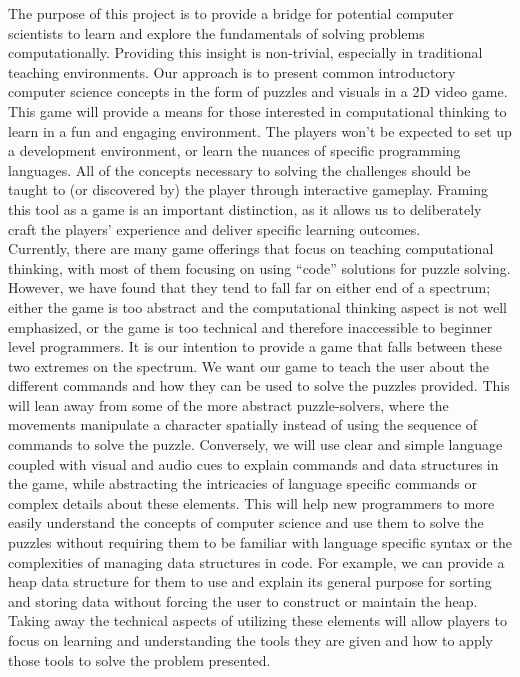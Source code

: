 The purpose of this project is to provide a bridge for potential computer
scientists to learn and explore the fundamentals of solving problems
computationally. Providing this insight is non-trivial, especially in
traditional teaching environments. Our approach is to present common
introductory computer science concepts in the form of puzzles and visuals in a
2D video game. This game will provide a means for those interested in
computational thinking to learn in a fun and engaging environment. The players
won’t be expected to set up a development environment, or learn the nuances of
specific programming languages. All of the concepts necessary to solving the
challenges should be taught to (or discovered by) the player through interactive
gameplay. Framing this tool as a game is an important distinction, as it allows
us to deliberately craft the players’ experience and deliver specific learning
outcomes.\\

Currently, there are many game offerings that focus on teaching computational
thinking, with most of them focusing on using “code” solutions for puzzle
solving. However, we have found that they tend to fall far on either end of a
spectrum; either the game is too abstract and the computational thinking aspect
is not well emphasized, or the game is too technical and therefore inaccessible
to beginner level programmers. It is our intention to provide a game that falls
between these two extremes on the spectrum. We want our game to teach the user
about the different commands and how they can be used to solve the puzzles
provided. This will lean away from some of the more abstract puzzle-solvers,
where the movements manipulate a character spatially instead of using the
sequence of commands to solve the puzzle. Conversely, we will use clear and
simple language coupled with visual and audio cues to explain commands and data
structures in the game, while abstracting the intricacies of language specific
commands or complex details about these elements. This will help new programmers
to more easily understand the concepts of computer science and use them to solve
the puzzles without requiring them to be familiar with language specific syntax
or the complexities of managing data structures in code. For example, we can
provide a heap data structure for them to use and explain its general purpose
for sorting and storing data without forcing the user to construct or maintain
the heap. Taking away the technical aspects of utilizing these elements will
allow players to focus on learning and understanding the tools they are given
and how to apply those tools to solve the problem presented.
